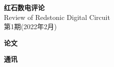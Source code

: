 \documentclass[UTF8,12pt,punct=kaiming,fontset=none]{ctexart}
\begin{document}
\thispagestyle{empty}
\BgThispage
\quad
\newpage

\quad
\vspace{-0.3cm}
\begin{center}
    \fontsize{46pt}{54.2pt} \textbf{红石数电评论} \\
    \Large Review of Redstonic Digital Circuit \\
    \Large 第1期(2022年2月)
\end{center}

\makeatletter
\newcommand{\cdotfill}{\leavevmode\cleaders\hb@xt@ 0.56cm{\hss\ensuremath{\cdots}\hss }\hfill\kern\z@}
\makeatother
{}
\setcounter{currentPageNumber}{3}
\newcommand{\addContent}{
    \setcounter{nextPageNumber}{\arabic{currentPageNumber}}
    \ifthenelse{\pageNumber>1}{
        \addtocounter{nextPageNumber}{\pageNumber}
        \addtocounter{nextPageNumber}{-1}
        \fileName\cdotfill\authorName\quad\arabic{currentPageNumber} - \arabic{nextPageNumber}
    }{
        \fileName\cdotfill\authorName\quad\arabic{currentPageNumber}
    }
    \addtocounter{currentPageNumber}{\pageNumber}
    
}

\begin{spacing}{2.0}

\large\sffamily\bfseries 论文

\normalsize\normalfont


\large\sffamily\bfseries 通讯

\normalsize\normalfont


\end{spacing}

\vspace{1cm}
\end{document}
